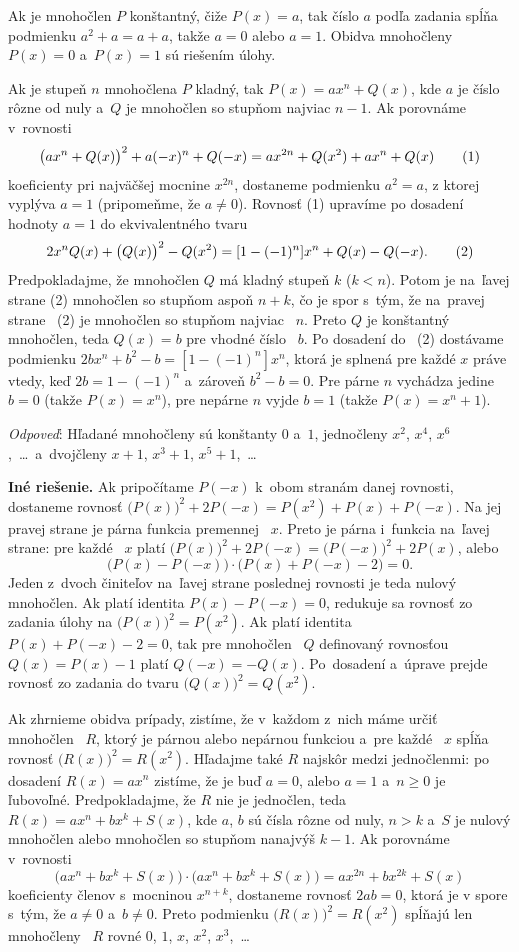 {%
Ak je mnohočlen $P$ konštantný, čiže $P(x)=a$, tak
číslo $a$ podľa zadania spĺňa podmienku $a^2+a=a+a$,
takže $a=0$ alebo $a=1$. Obidva mnohočleny $P(x)=0$ a~$P(x)=1$
sú riešením úlohy.

Ak je stupeň $n$ mnohočlena $P$ kladný,
tak $P(x)=ax^n+Q(x)$, kde $a$ je číslo rôzne od nuly
a~$Q$ je mnohočlen so stupňom najviac $n-1$. Ak porovnáme v~rovnosti
$$
\bigl(ax^n+Q(x)\bigr)^2+a(-x)^n+Q(-x)=ax^{2n}+Q(x^2)+ax^n+Q(x)
\tag1
$$
koeficienty pri najväčšej mocnine $x^{2n}$, dostaneme podmienku
$a^2=a$, z ktorej vyplýva $a=1$ (pripomeňme, že $a\ne0$). Rovnosť
(1) upravíme po dosadení hodnoty $a=1$ do ekvivalentného tvaru
$$
2x^nQ(x)+\bigl(Q(x)\bigr)^2-Q(x^2)=[1-(-1)^n]x^n+Q(x)-Q(-x).
\tag2
$$
Predpokladajme, že mnohočlen $Q$ má kladný stupeň $k$ ($k<n$). Potom
je na~ľavej strane (2) mnohočlen so stupňom aspoň $n+k$, čo je
spor s~tým, že na~pravej strane~ (2) je mnohočlen so stupňom najviac~
$n$. Preto $Q$ je konštantný mnohočlen, teda $Q(x)=b$ pre vhodné
číslo~ $b$. Po dosadení do~ (2) dostávame podmienku
$2bx^n+b^2-b=[1-({-1})^n]x^n$, ktorá je splnená pre každé $x$
práve vtedy, keď $2b=1-({-1})^n$ a~zároveň $b^2-b=0$. Pre párne $n$
vychádza jedine $b=0$ (takže $P(x)=x^n$), pre nepárne $n$ vyjde
$b=1$ (takže $P(x)=x^n+1$).

{\it Odpoveď\/}: Hľadané mnohočleny sú konštanty
$0$ a~$1$, jednočleny $x^2$, $x^4$, $x^6$,~\dots\ a~dvojčleny
$x+1$, $x^3+1$, $x^5+1$,~\dots

\medskip
{\bf Iné riešenie.}
Ak pripočítame $P(-x)$ k~obom stranám danej rovnosti, dostaneme
rovnosť $\bigl(P(x)\bigr)^2+2P(-x)=P(x^2)+P(x)+P(-x)$. Na jej
pravej strane je párna funkcia premennej~ $x$. Preto je párna i~funkcia
na~ľavej strane: pre každé~ $x$ platí $\bigl(P(x)\bigr)^2+2P({-x})=
\bigl(P(-x)\bigr)^2+2P(x)$, alebo
$$
\bigl(P(x)-P(-x)\bigr)\cdot\bigl(P(x)+P(-x)-2\bigr)=0.
$$
Jeden z~dvoch činiteľov na~ľavej strane poslednej rovnosti je teda
nulový mnohočlen. Ak platí identita $P(x)-P(-x)=0$, redukuje
sa rovnosť zo zadania úlohy na $\bigl(P(x)\bigr)^2=P(x^2)$. Ak
platí identita $P(x)+P(-x)-2=0$, tak pre mnohočlen~ $Q$
definovaný rovnosťou $Q(x)=P(x)-1$ platí $Q(-x)=-Q(x)$. Po~dosadení
a~úprave prejde rovnosť zo zadania do tvaru
$\bigl(Q(x)\bigr)^2=Q(x^2)$.

Ak zhrnieme obidva prípady, zistíme, že v~každom z~nich máme
určiť mnohočlen~ $R$, ktorý je párnou alebo nepárnou funkciou
a~pre každé~ $x$ spĺňa rovnosť $\bigl(R(x)\bigr)^2=R(x^2)$. Hľadajme
také $R$ najskôr medzi jednočlenmi: po dosadení $R(x)=ax^n$
zistíme, že je buď $a=0$, alebo $a=1$ a~$n\geq0$ je ľubovoľné.
Predpokladajme, že $R$ nie je jednočlen, teda $R(x)=ax^n+bx^k+S(x)$, kde
$a$, $b$ sú čísla rôzne od nuly, $n>k$ a~$S$ je nulový
mnohočlen alebo mnohočlen so stupňom nanajvýš $k-1$. Ak porovnáme
v~rovnosti
$$
\bigl(ax^n+bx^k+S(x)\bigr)\cdot\bigl(ax^n+bx^k+S(x)\bigr)
       =ax^{2n}+bx^{2k}+S(x)
$$
koeficienty členov s~mocninou $x^{n+k}$, dostaneme rovnosť
$2ab=0$, ktorá je v spore s~tým, že $a\ne0$ a~$b\ne0$. Preto
podmienku $\bigl(R(x)\bigr)^2=R(x^2)$ spĺňajú len mnohočleny~ $R$
rovné $0$, $1$, $x$, $x^2$, $x^3$,~\dots
}

